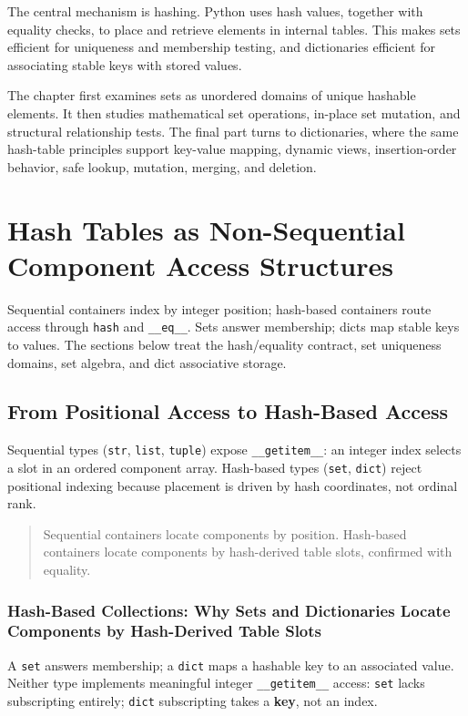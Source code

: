 \documentclass[a4paper,twoside]{report}
\begin{document}
The central mechanism is hashing. Python uses hash values, together with equality checks, to place and retrieve elements in internal tables. This makes sets efficient for uniqueness and membership testing, and dictionaries efficient for associating stable keys with stored values.

The chapter first examines sets as unordered domains of unique hashable elements. It then studies mathematical set operations, in-place set mutation, and structural relationship tests. The final part turns to dictionaries, where the same hash-table principles support key-value mapping, dynamic views, insertion-order behavior, safe lookup, mutation, merging, and deletion.

\section{Hash Tables as Non-Sequential Component Access Structures}

Sequential containers index by integer position; hash-based containers route access through \texttt{hash} and \texttt{\_\_eq\_\_}. Sets answer membership; dicts map stable keys to values. The sections below treat the hash/equality contract, set uniqueness domains, set algebra, and dict associative storage.


\subsection{From Positional Access to Hash-Based Access}

Sequential types (\texttt{str}, \texttt{list}, \texttt{tuple}) expose \texttt{\_\_getitem\_\_}: an integer index selects a slot in an ordered component array. Hash-based types (\texttt{set}, \texttt{dict}) reject positional indexing because placement is driven by hash coordinates, not ordinal rank.

\begin{quote}
Sequential containers locate components by position. Hash-based containers locate components by hash-derived table slots, confirmed with equality.
\end{quote}

\subsubsection{Hash-Based Collections: Why Sets and Dictionaries Locate Components by Hash-Derived Table Slots}

A \texttt{set} answers membership; a \texttt{dict} maps a hashable key to an associated value. Neither type implements meaningful integer \texttt{\_\_getitem\_\_} access: \texttt{set} lacks subscripting entirely; \texttt{dict} subscripting takes a \textbf{key}, not an index.
\end{document}
